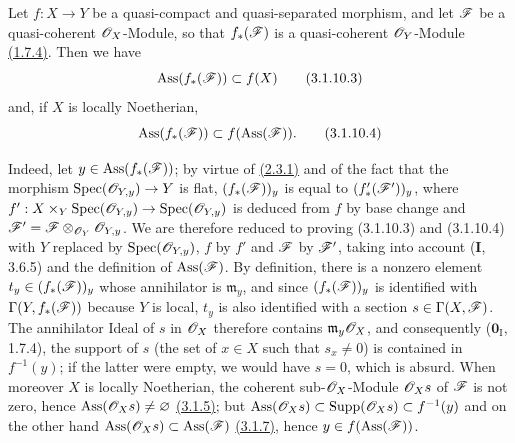\begin{remark}[3.1.10.2]
\label{IV.3.1.10.2}
Let $f:X\to Y$ be a quasi-compact and quasi-separated morphism, and let
$\mathscr{F}$ be a quasi-coherent $\mathscr{O}_X$-Module, so that
$f_*(\mathscr{F})$ is a quasi-coherent $\mathscr{O}_Y$-Module
{\hyperref[IV.1.7.4]{(1.7.4)}}. Then we have
\begin{equation}
 \operatorname{Ass}(f_*(\mathscr{F}))\subset f(X)
 \label{IV.3.1.10.3}\tag{3.1.10.3}
\end{equation}
and, if $X$ is locally Noetherian,
\begin{equation}
 \operatorname{Ass}(f_*(\mathscr{F}))\subset f(\operatorname{Ass}(\mathscr{F})).
 \label{IV.3.1.10.4}\tag{3.1.10.4}
\end{equation}

Indeed, let $y\in\operatorname{Ass}(f_*(\mathscr{F}))$; by virtue of
{\hyperref[IV.2.3.1]{(2.3.1)}} and of the fact that the morphism
$\operatorname{Spec}(\mathscr{O}_{Y,y})\to Y$ is flat,
$(f_*(\mathscr{F}))_y$ is equal to $(f'_*(\mathscr{F}'))_y$, where
$f':X\times_Y\operatorname{Spec}(\mathscr{O}_{Y,y})\to\operatorname{Spec}(\mathscr{O}_{Y,y})$
is deduced from $f$ by base change and
$\mathscr{F}'=\mathscr{F}\otimes_{\mathscr{O}_Y}\mathscr{O}_{Y,y}$. We are therefore reduced to
proving (3.1.10.3) and (3.1.10.4) with $Y$ replaced by
$\operatorname{Spec}(\mathscr{O}_{Y,y})$, $f$ by $f'$ and $\mathscr{F}$ by
$\mathscr{F}'$, taking into account (\textbf{I}, 3.6.5) and the definition of
$\operatorname{Ass}(\mathscr{F})$.
By definition, there is a nonzero element
$t_y\in(f_*(\mathscr{F}))_y$ whose annihilator is $\mathfrak m_y$, and since
$(f_*(\mathscr{F}))_y$ is identified with $\Gamma(Y,f_*(\mathscr{F}))$ because $Y$ is
local, $t_y$ is also identified with a section $s\in\Gamma(X,\mathscr{F})$. The
annihilator Ideal of $s$ in $\mathscr{O}_X$ therefore contains $\mathfrak m_y\mathscr{O}_X$,
and consequently ($\mathbf{0}_{\mathrm I}$, 1.7.4), the support of $s$ (the set of
$x\in X$ such that $s_x\neq0$) is contained in
$f^{-1}(y)$; if the latter were empty, we would have $s=0$, which is
absurd. When moreover $X$ is locally Noetherian, the coherent
sub-$\mathscr{O}_X$-Module $\mathscr{O}_Xs$ of $\mathscr{F}$ is not zero,
hence $\operatorname{Ass}(\mathscr{O}_Xs)\neq\varnothing$
{\hyperref[IV.3.1.5]{(3.1.5)}}; but
$\operatorname{Ass}(\mathscr{O}_Xs)\subset\operatorname{Supp}(\mathscr{O}_Xs)\subset f^{-1}(y)$ and on the other hand
$\operatorname{Ass}(\mathscr{O}_Xs)\subset\operatorname{Ass}(\mathscr{F})$
{\hyperref[IV.3.1.7]{(3.1.7)}}, hence
$y\in f(\operatorname{Ass}(\mathscr{F}))$.
\end{remark}

